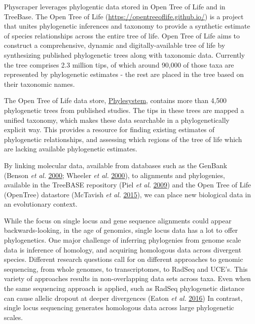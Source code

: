 \documentclass[]{article}
\begin{document}
Physcraper leverages phylogentic data stored in Open Tree of Life and in TreeBase.
The Open Tree of Life (\url{https://opentreeoflife.github.io/}) is a project that unites phylogenetic inferences and taxonomy to provide a synthetic estimate of species relationships across the entire tree of life.
Open Tree of Life aims to construct a comprehensive, dynamic and digitally-available tree of life by synthesizing published phylogenetic trees along with taxonomic data.
Currently the tree comprises 2.3 million tips, of which around 90,000 of those taxa are represented by phylogenetic estimates - the rest are placed in the tree based on their taxonomic names.

The Open Tree of Life data store, \href{https://academic.oup.com/bioinformatics/article/31/17/2794/183373}{Phylesystem}, contains more than 4,500 phylogenetic trees from published studies.
The tips in these trees are mapped a unified taxonomy, which makes these data searchable in a phylogenetically explicit way.
This provides a resource for finding existing estimates of phylogenetic relationships,
and assessing which regions of the tree of life which are lacking available phylogenetic estimates.

By linking molecular data, available from databases such as the GenBank (Benson \emph{et al.} \protect\hyperlink{ref-benson2000genbank}{2000}; Wheeler \emph{et al.} \protect\hyperlink{ref-wheeler2000database}{2000}), to alignments and phylogenies, available in
the TreeBASE repository (Piel \emph{et al.} \protect\hyperlink{ref-piel2009treebase}{2009}) and the Open Tree of Life (OpenTree) datastore (McTavish \emph{et al.} \protect\hyperlink{ref-mctavish2015phylesystem}{2015}), we can place new biological data in an evolutionary context.

While the focus on single locus and gene sequence alignments could appear backwards-looking, in the age of genomics, single locus data has a lot to offer phylogenetics.
One major challenge of inferring phylogenies from genome scale data is inference of homology, and acquiring homologous data across divergent species.
Different research questions call for on different approaches to genomic sequencing, from whole genomes, to transcriptomes, to RadSeq and UCE's.
This variety of approaches results in non-overlapping data sets across taxa.
Even when the same sequencing approach is applied, such as RadSeq phylogenetic distance can cause allelic dropout at deeper divergences (Eaton \emph{et al.} \protect\hyperlink{ref-eaton2016misconceptions}{2016})
In contrast, single locus sequencing generates homologous data across large phylogenetic scales.
\end{document}
